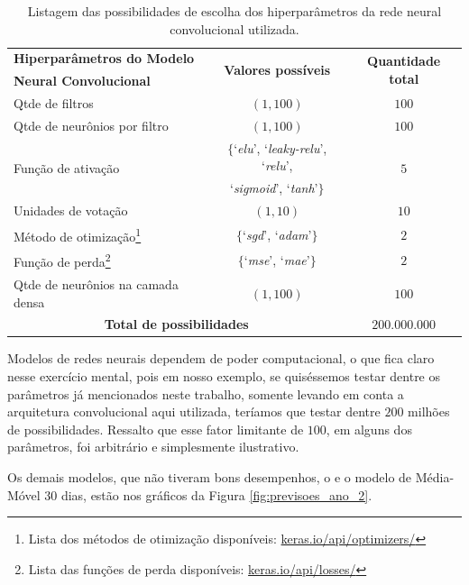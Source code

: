 \begin{table}[]
\begin{center}
\begin{tabular}{|l|c|c|}
\hline
\textbf{Hiperparâmetros do Modelo} & \multirow{2}{*}{\textbf{Valores possíveis}} & \multirow{2}{*}{\textbf{Quantidade total}} \\
\textbf{Neural Convolucional} && \\
\hline
\hline
Qtde de filtros & $(1, 100)$  & $100$\\
Qtde de neurônios por filtro & $(1, 100)$ & $100$ \\
\multirow{2}{*}{Função de ativação} & $\{$`\emph{elu}', `\emph{leaky-relu}', `\emph{relu}', & \multirow{2}{*}{$5$} \\ & `\emph{sigmoid}', `\emph{tanh}'$\}$ & \\
Unidades de votação & $(1, 10)$  & $10$ \\
Método de otimização\footnote{Lista dos métodos de otimização disponíveis: \url{keras.io/api/optimizers/}} & $\{$`\emph{sgd}', `\emph{adam}'$\}$ & $2$ \\
Função de perda\footnote{Lista das funções de perda disponíveis: \url{keras.io/api/losses/}} & $\{$`\emph{mse}', `\emph{mae}'$\}$  & $2$ \\
Qtde de neurônios na camada densa & $(1, 100)$ & $100$ \\
\hline
\multicolumn{2}{|c|}{\textbf{Total de possibilidades}} & $200.000.000$ \\
\hline
\end{tabular}
\caption{Listagem das possibilidades de escolha dos hiperparâmetros da rede neural convolucional utilizada.}\label{tabela:possibilidades}
\end{center}
\end{table}

Modelos de redes neurais dependem de poder computacional, o que fica claro nesse exercício mental, pois em nosso exemplo, se quiséssemos testar dentre os parâmetros já mencionados neste trabalho, somente levando em conta a arquitetura convolucional aqui utilizada, teríamos que testar dentre $200$ milhões de possibilidades. Ressalto que esse fator limitante de $100$, em alguns dos parâmetros, foi arbitrário e simplesmente ilustrativo.

Os demais modelos, que não tiveram bons desempenhos, o  e o modelo de Média-Móvel $30$ dias, estão nos gráficos da Figura \ref{fig:previsoes_ano_2}.

